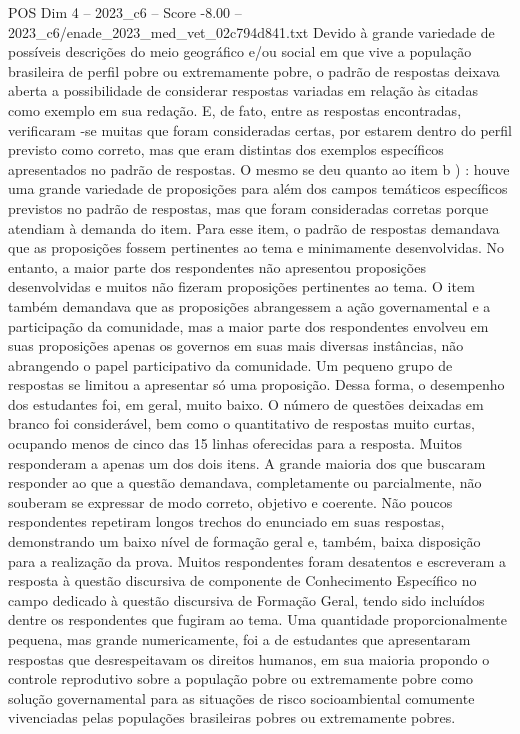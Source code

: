 \begin{textsample}{POS Dim 4 – 2023\_c6 – Score -8.00 – 2023\_c6/enade\_2023\_med\_vet\_02c794d841.txt}
Devido à grande variedade de possíveis descrições do meio geográfico e/ou social em que vive a população brasileira de perfil pobre ou extremamente pobre, o padrão de respostas deixava aberta a possibilidade de considerar respostas variadas em relação às citadas como exemplo em sua redação.
E, de fato, entre as respostas encontradas, verificaram -se muitas que foram consideradas certas, por estarem dentro do perfil previsto como correto, mas que eram distintas dos exemplos específicos apresentados no padrão de respostas.
O mesmo se deu quanto ao item b ) : houve uma grande variedade de proposições para além dos campos temáticos específicos previstos no padrão de respostas, mas que foram consideradas corretas porque atendiam à demanda do item.
Para esse item, o padrão de respostas demandava que as proposições fossem pertinentes ao tema e minimamente desenvolvidas.
No entanto, a maior parte dos respondentes não apresentou proposições desenvolvidas e muitos não fizeram proposições pertinentes ao tema.
O item também demandava que as proposições abrangessem a ação governamental e a participação da comunidade, mas a maior parte dos respondentes envolveu em suas proposições apenas os governos em suas mais diversas instâncias, não abrangendo o papel participativo da comunidade.
Um pequeno grupo de respostas se limitou a apresentar só uma proposição.
Dessa forma, o desempenho dos estudantes foi, em geral, muito baixo.
O número de questões deixadas em branco foi considerável, bem como o quantitativo de respostas muito curtas, ocupando menos de cinco das 15 linhas oferecidas para a resposta.
Muitos responderam a apenas um dos dois itens.
A grande maioria dos que buscaram responder ao que a questão demandava, completamente ou parcialmente, não souberam se expressar de modo correto, objetivo e coerente.
Não poucos respondentes repetiram longos trechos do enunciado em suas respostas, demonstrando um baixo nível de formação geral e, também, baixa disposição para a realização da prova.
Muitos respondentes foram desatentos e escreveram a resposta à questão discursiva de componente de Conhecimento Específico no campo dedicado à questão discursiva de Formação Geral, tendo sido incluídos dentre os respondentes que fugiram ao tema.
Uma quantidade proporcionalmente pequena, mas grande numericamente, foi a de estudantes que apresentaram respostas que desrespeitavam os direitos humanos, em sua maioria propondo o controle reprodutivo sobre a população pobre ou extremamente pobre como solução governamental para as situações de risco socioambiental comumente vivenciadas pelas populações brasileiras pobres ou extremamente pobres.

\end{textsample}
